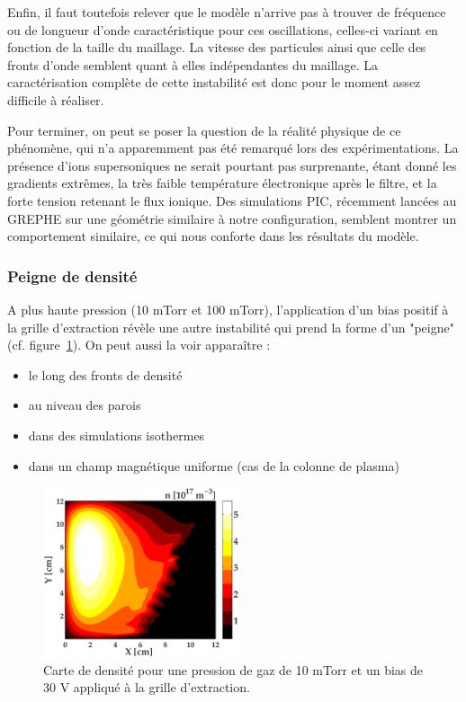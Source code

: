 \begin{refsection}
Enfin, il faut toutefois relever que le modèle n'arrive pas à trouver 
de fréquence ou de longueur d'onde caractéristique pour ces oscillations,
celles-ci variant en fonction de la taille du maillage. La
vitesse des particules ainsi que celle des fronts d'onde semblent quant à
elles indépendantes du maillage.
La caractérisation complète de cette instabilité est donc pour le moment
assez difficile à réaliser.

Pour terminer, on peut se poser la question de la réalité physique de
ce phénomène, qui n'a apparemment pas été remarqué lors des expérimentations. La
présence d'ions supersoniques ne serait pourtant pas surprenante, étant donné
les gradients extrêmes, la très faible température électronique 
après le filtre, et la forte tension retenant le flux ionique.
Des simulations PIC, récemment lancées au GREPHE sur une géométrie similaire
à notre configuration, semblent montrer un comportement similaire, ce qui nous
conforte dans les résultats du modèle.

	\subsubsection{Peigne de densité}
	A plus haute pression (10 mTorr et 100 mTorr), l'application d'un bias positif
	à la grille d'extraction révèle une autre instabilité qui prend la forme d'un
	"peigne" (cf.
	figure~\ref{4-PegasesCarteDensiteVarBias5}). On peut aussi la voir apparaître :
	
	\begin{itemize}
	  \item le long des fronts de densité
	  \item au niveau des parois
	  \item dans des simulations isothermes
	  \item dans un champ magnétique uniforme (cas de la colonne de plasma)
	\end{itemize}
		
\begin{figure}[!htbp]
  \centering
    \includegraphics[height=5cm]{figures/4-PegasesCarteDensiteVarBias5.eps}
    \caption{Carte de densité pour une pression de gaz de 10 mTorr et un bias
    de 30 V appliqué à la grille
    d'extraction.\label{4-PegasesCarteDensiteVarBias5}}
\end{figure}
	

\end{refsection}
